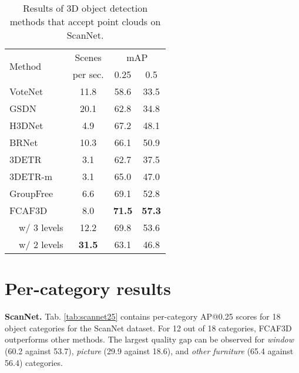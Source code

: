 \documentclass[runningheads]{llncs}
\begin{document}
\begin{table}[h!]
    \centering \setlength{\tabcolsep}{2.5pt}
    \begin{tabular}{l|ccc}
    \hline
    \multirow[l]{2}{*}{Method} & Scenes & \multicolumn{2}{c}{mAP} \\
    & per sec. & 0.25 & 0.5 \\ \hline
    VoteNet\cite{qi2019votenet} & 11.8 & 58.6 & 33.5 \\
    GSDN\cite{gwak2020gsdn} & 20.1 & 62.8 & 34.8 \\
    H3DNet\cite{zhang2020h3dnet} & 4.9 & 67.2 & 48.1 \\
    BRNet\cite{cheng2021brnet} & 10.3 & 66.1 & 50.9 \\
    3DETR\cite{misra20213detr} & 3.1 & 62.7 & 37.5 \\
    3DETR-m\cite{misra20213detr} & 3.1 & 65.0 & 47.0 \\
    GroupFree\cite{liu2021group-free} & 6.6 & 69.1 & 52.8 \\
    FCAF3D & 8.0 & \textbf{71.5} & \textbf{57.3} \\
    \ \  w/ 3 levels & 12.2 & 69.8 & 53.6 \\
    \ \  w/ 2 levels & \textbf{31.5} & 63.1 & 46.8 \\ \hline
    \end{tabular}
    \caption{Results of 3D object detection methods that accept point clouds on ScanNet.}
    \label{tab:fps}
\end{table}

\section{Per-category results}

\textbf{ScanNet.} Tab. \ref{tab:scannet25} contains per-category AP@0.25 scores for 18 object categories for the ScanNet dataset. For 12 out of 18 categories, FCAF3D outperforms other methods. The largest quality gap can be observed for \textit{window} (60.2 against 53.7), \textit{picture} (29.9 against 18.6), and \textit{other furniture} (65.4 against 56.4) categories.
\end{document}
